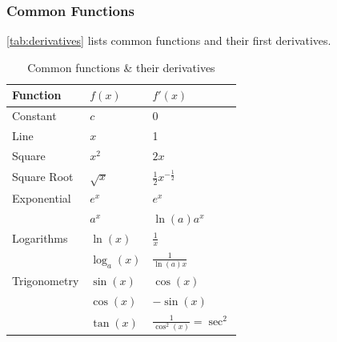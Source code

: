 \subsubsection{Common Functions}
\autoref{tab:derivatives} lists common functions and their first derivatives.
\begin{table}[ht]
	\caption{Common functions \& their derivatives}\label{tab:derivatives}
\centering
	\renewcommand{\arraystretch}{2}
	\setlength{\tabcolsep}{12pt}
	\begin{tabular}{@{}lll@{}}

		\toprule
		Function     & \(f(x)\)        & \(f'(x)\)                         \\ \midrule
		Constant     & \(c\)               & 0                                 \\
		Line         & \(x\)               & 1                                 \\
		Square       & \(x^2\)         & \(2x\)                            \\
		Square Root  & \(\sqrt{x}\)    & \(\frac{1}{2}x^{-\frac{1}{2}}\)   \\
		Exponential  & \(e^x\)         & \(e^x\)                           \\
		             & \(a^x\)         & \(\ln(a)a^x\)                     \\
		Logarithms   & \(\ln(x)\)      & \(\frac{1}{x}\)                   \\
		             & \( \log_a(x) \) & \( \frac{1}{\ln(a)x} \)            \\
		Trigonometry & \(\sin(x) \)    & \(\cos(x)  \)                     \\
		             & \( \cos(x) \)   & \(-\sin(x) \)                     \\
		             & \( \tan(x) \)   & \( \frac{1}{\cos^2(x)} = \sec^2\) \\ \bottomrule
	\end{tabular}

\end{table}

